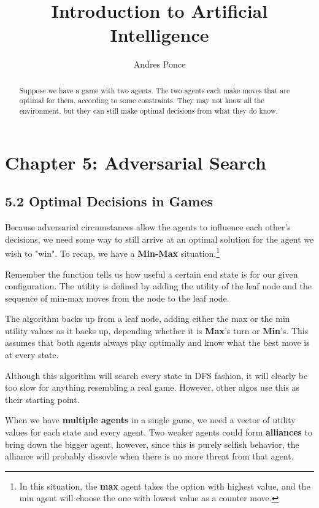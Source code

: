 \documentclass{tufte-handout}
\title{Introduction to Artificial Intelligence}
\author{Andres Ponce}
\begin{document}
\maketitle
\begin{abstract}
	Suppose we have a game with two agents. The two agents each
	make moves that are optimal for them, according to some constraints. 
	They may not know all the environment, but they can still make 
	optimal decisions from what they do know.
\end{abstract}
\section{Chapter 5: Adversarial Search}

\subsection{5.2 Optimal Decisions in Games}
	Because adversarial circumstances allow the agents to influence each 
	other's decisions, we need some way to still arrive at an optimal 
	solution for the agent we wish to "win". To recap, we have a 
	\textbf{Min-Max} situation.\footnote{In this situation, the \textbf{max}
	agent takes the option with highest value, and the min agent will choose
	the one with lowest value as a counter move.} 

	Remember the  function tells us how useful a certain 
	end state is for our given configuration. The utility is defined by adding
	the utility of the leaf node and the sequence of min-max moves from the node
	to the leaf node. 

	The  algorithm backs up from a leaf node, adding
	either the max or the min utility values as it backs up, depending whether
	it is \textbf{Max}'s turn or \textbf{Min}'s. This assumes that both agents 
	always play optimally and know what the best move is at every state. 
	
	Although this algorithm will search every state in DFS fashion, it will 
	clearly be too slow for anything resembling a real game. However, other algos 
	use this as their starting point. 
	
	When we have \textbf{multiple agents} in a single game, we need a vector of 
	utility values for each state and every agent. Two weaker agents could form 
	\textbf{alliances} to bring down the bigger agent, however, since this is purely 
	selfish behavior, the alliance will probably dissovle when there is no more threat 
	from that agent. 
	
\end{document}
